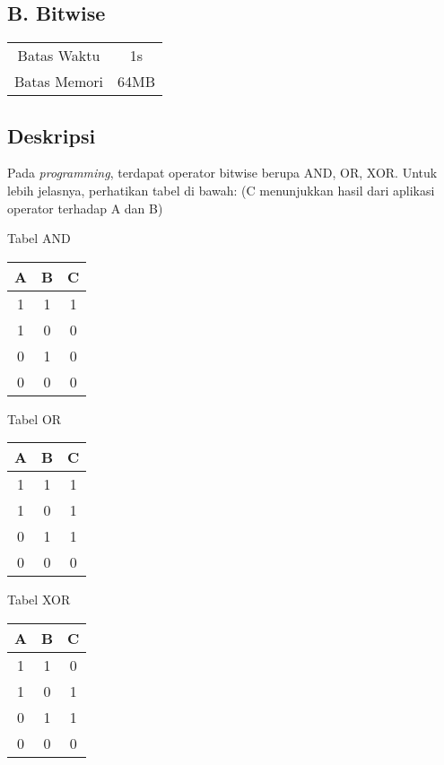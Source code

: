 \documentclass{article}
\begin{document}
\begin{center}
    \section*{B. Bitwise}

    \begin{tabular}{ | c c | }
        \hline
        Batas Waktu  & 1s \\
        Batas Memori & 64MB \\
        \hline
    \end{tabular}
\end{center}

\subsection*{Deskripsi}

Pada \textit{programming}, terdapat operator bitwise berupa AND, OR, XOR.
Untuk lebih jelasnya, perhatikan tabel di bawah: (C menunjukkan hasil dari aplikasi operator terhadap A dan B)

\begin{multicols}{3}
    Tabel AND

    \begin{tabular} { | c c | c | }
        \hline
        A & B & C \\
        \hline
        1 & 1 & 1 \\
        1 & 0 & 0 \\
        0 & 1 & 0 \\
        0 & 0 & 0 \\
        \hline
    \end{tabular}

    Tabel OR

    \begin{tabular} { | c c | c | }
        \hline
        A & B & C \\
        \hline
        1 & 1 & 1 \\
        1 & 0 & 1 \\
        0 & 1 & 1 \\
        0 & 0 & 0 \\
        \hline
    \end{tabular}

    Tabel XOR

    \begin{tabular} { | c c | c | }
        \hline
        A & B & C \\
        \hline
        1 & 1 & 0 \\
        1 & 0 & 1 \\
        0 & 1 & 1 \\
        0 & 0 & 0 \\
        \hline
    \end{tabular}
\end{multicols}
\end{document}
